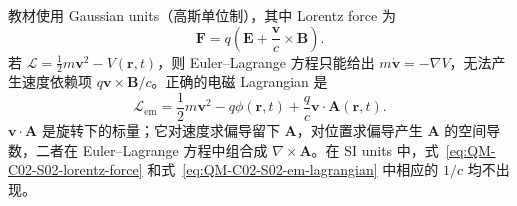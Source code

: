 
教材使用 Gaussian units（高斯单位制），其中 Lorentz force 为
\begin{equation}
  \boxed{
  \bm F=q\left(\bm E+\frac{\bm v}{c}\times\bm B\right).}
  \label{eq:QM-C02-S02-lorentz-force}
\end{equation}
若 $\mathcal L=\frac12m\bm v^2-V(\bm r,t)$，则 Euler--Lagrange 方程只能给出 $m\dot{\bm v}=-\nabla V$，无法产生速度依赖项 $q\bm v\times\bm B/c$。正确的电磁 Lagrangian 是
\begin{equation}
  \boxed{
  \mathcal L_{\mathrm{em}}
  =\frac12m\bm v^2-q\phi(\bm r,t)
  +\frac qc\bm v\cdot\bm A(\bm r,t).}
  \label{eq:QM-C02-S02-em-lagrangian}
\end{equation}
$\bm v\cdot\bm A$ 是旋转下的标量；它对速度求偏导留下 $\bm A$，对位置求偏导产生 $\bm A$ 的空间导数，二者在 Euler--Lagrange 方程中组合成 $\nabla\times\bm A$。在 SI units 中，式~\eqref{eq:QM-C02-S02-lorentz-force} 和式~\eqref{eq:QM-C02-S02-em-lagrangian} 中相应的 $1/c$ 均不出现。


